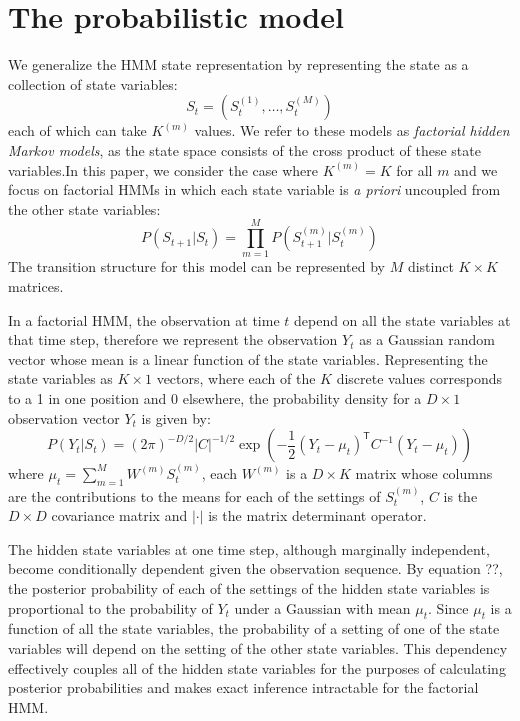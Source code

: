 \documentclass{article}
\begin{document}
\section{The probabilistic model}
We generalize the HMM state representation by representing the state as a collection of state variables:
\[ S_t = (S_t^{(1)},\dots,S_t^{(M)}) \]
each of which can take $K^{(m)}$ values. We refer to these models as \emph{factorial hidden Markov models}, as the state space consists of the cross product of these state variables.In this paper, we consider the case where $K^{(m)} = K$ for all $m$ and we focus on factorial HMMs in which each state variable is \emph{a priori} uncoupled from the other state variables:
\begin{equation} 
P(S_{t+1}|S_t) = \prod_{m=1}^M P(S_{t+1}^{(m)}|S_t^{(m)}) 
\end{equation}
The transition structure for this model can be represented by $M$ distinct $K \times K$ matrices.

In a factorial HMM, the observation at time $t$ depend on all the state variables at that time step, therefore we represent the observation $Y_t$ as a Gaussian random vector whose mean is a linear function of the state variables. Representing the state variables as $K \times 1$ vectors, where each of the $K$ discrete values corresponds to a 1 in one position and 0 elsewhere, the probability density for a $D \times 1$ observation vector $Y_t$ is given by:
\begin{equation}
P(Y_t|S_t) = (2 \pi)^{-D/2} \left| C \right|^{-1/2} \exp \left( -\frac{1}{2} (Y_t - \mu_t)^\mathsf{T} C^{-1} (Y_t - \mu_t) \right)
\end{equation}  
where $\mu_t = \sum_{m=1}^M W^{(m)} S_t^{(m)}$, each $W^{(m)}$ is a $D \times K$ matrix whose columns are the contributions to the means for each of the settings of $S_t^{(m)}$, $C$ is the $D \times D$ covariance matrix and $\left| \cdot \right|$ is the matrix determinant operator.

The hidden state variables at one time step, although marginally independent, become conditionally dependent given the observation sequence. By equation ??, the posterior probability of each of the settings of the hidden state variables is proportional to the probability of $Y_t$ under a Gaussian with mean $\mu_t$. Since $\mu_t$ is a function of all the state variables, the probability of a setting of one of the state variables will depend on the setting of the other state variables. This dependency effectively couples all of the hidden state variables for the purposes of calculating posterior probabilities and makes exact inference intractable for the factorial HMM.
\end{document}
